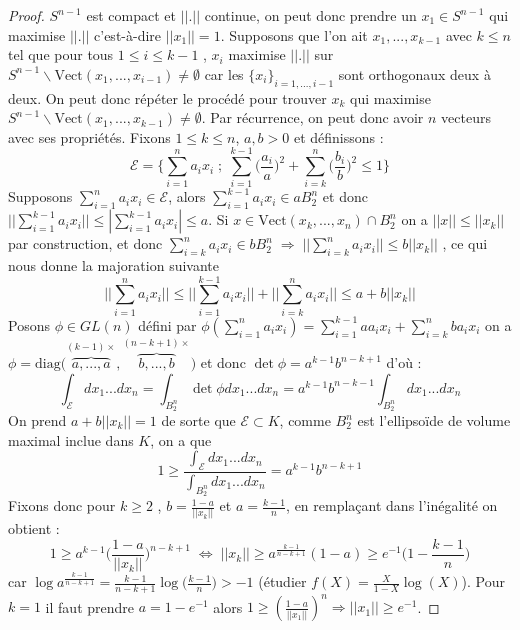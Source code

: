 \documentclass[12pt]{article}
\theoremstyle{definition}
\begin{document}
\begin{proof}
	$S^{n-1}$ est compact et $||.||$ continue, on peut donc prendre un $x_1\in S^{n-1}$ qui maximise $||.||$ c'est-à-dire $||x_1||=1$. Supposons que l'on ait $x_1,...,x_{k-1}$ avec $k\leq n$ tel que pour tous $1\leq i\leq k-1$ , $x_i$ maximise $||.||$ sur $S^{n-1}\backslash \text{Vect}(x_1,...,x_{i-1})\neq \emptyset$ car les $\{x_i\}_{i=1,...,i-1}$ sont orthogonaux deux à deux. On peut donc répéter le procédé pour trouver $x_{k}$ qui maximise $S^{n-1}\backslash \text{Vect}(x_1,...,x_{k-1})\neq \emptyset$. Par récurrence, on peut donc avoir $n$ vecteurs avec ses propriétés. Fixons $1\leq k \leq n$, $a,b>0$ et définissons :
	\begin{equation*}
	\mathcal{E} = \Big\{\sum_{i=1}^{n}a_ix_i\; ; \; \sum_{i=1}^{k-1}\big(\frac{a_i}{a}\big)^2+ \sum_{i=k}^{n}\big(\frac{b_i}{b}\big)^2\leq 1 \Big\}
	\end{equation*}
	Supposons $\sum_{i=1}^{n}a_ix_i\in \mathcal{E}$, alors $\sum_{i=1}^{k-1}a_ix_i\in aB_2^n$ et donc $||\sum_{i=1}^{k-1}a_ix_i||\leq|\sum_{i=1}^{k-1}a_ix_i|\leq a$.
	Si $x\in \text{Vect}(x_k,...,x_n)\cap B^n_2$ on a $||x||\leq ||x_k||$ par construction, et donc $\sum_{i=k}^{n}a_ix_i\in bB_2^n \; \Rightarrow \; ||\sum_{i=k}^{n}a_ix_i ||\leq b||x_k||$ , ce qui nous donne la majoration suivante 
	\begin{equation*}
	||\sum_{i=1}^{n}a_ix_i||\leq ||\sum_{i=1}^{k-1}a_ix_i||+||\sum_{i=k}^{n}a_ix_i||\leq a + b||x_k||
	\end{equation*}
	Posons $\phi\in GL(n)$ défini par $\phi(\sum_{i=1}^{n}a_ix_i)=\sum_{i=1}^{k-1}aa_ix_i+\sum_{i=k}^{n}ba_ix_i$ on a $\phi = \text{diag}\big(\overbrace{a,...,a}^{(k-1)\times},\overbrace{b,...,b}^{(n-k+1) \times}\big)$ et donc $\det \phi = a^{k-1}b^{n-k+1}$ d'où :
	\begin{equation*}
	\int_{\mathcal{E}} dx_1...dx_n = \int_{B_2^n} \det \phi dx_1...dx_n= a^{k-1}b^{n-k-1}\int_{B_2^n}dx_1...dx_n
	\end{equation*}
	On prend $a+b||x_k||= 1$ de sorte que $\mathcal{E}\subset K$, comme $B_2^n$ est l'ellipsoïde de volume maximal inclue dans $K$, on a que  
	\begin{equation*}
	1\geq\frac{\int_{\mathcal{E}} dx_1...dx_n}{\int_{B_2^n}dx_1...dx_n}=a^{k-1}b^{n-k+1}
	\end{equation*}
	Fixons donc pour $k\geq 2$ , $b=\frac{1-a}{||x_k||}$ et $a=\frac{k-1}{n}$, en remplaçant dans l'inégalité on obtient :
	\begin{equation*}
	1\geq a^{k-1} \Big(\frac{1-a}{||x_k||}\Big)^{n-k+1} \; \iff \; ||x_k||\geq a^{\frac{k-1}{n-k+1}}(1-a) \geq e^{-1}\Big(1-\frac{k-1}{n}\Big)
	\end{equation*}
	car $\log a^{\frac{k-1}{n-k+1}}= \frac{k-1}{n-k+1}\log\Big(\frac{k-1}{n}\Big)>-1$ (étudier $f(X)=\frac{X}{1-X}\log(X)$). Pour $k=1$ il faut prendre $a=1-e^{-1}$ alors $1\geq \left(\frac{1-a}{||x_1||}\right)^n\Rightarrow ||x_1||\geq e^{-1}$.
	
\end{proof}
\end{document}
